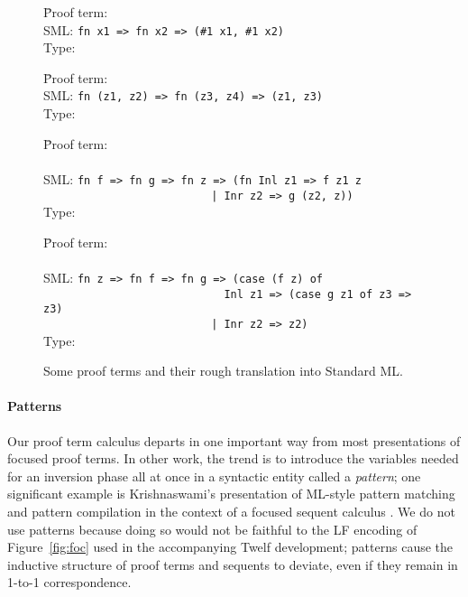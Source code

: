 \documentclass[acmtocl]{robtrans}\pdfoutput=1
\begin{document}
\begin{figure}
\begin{tabbing}
\qquad \=
Proof term: \= 
\\
\>SML: \> \verb'fn x1 => fn x2 => (#1 x1, #1 x2)'
\\
\>Type: \> 
\\
\end{tabbing}

\begin{tabbing}
\qquad \=
Proof term: \= 
\\
\>SML: \> \verb'fn (z1, z2) => fn (z3, z4) => (z1, z3)'
\\
\>Type: \> 
\\
\end{tabbing}

\begin{tabbing}
\qquad \=
Proof term: \= \=
      \\
\>\>\>
\\
\>SML: \> \verb'fn f => fn g => fn z => (fn Inl z1 => f z1 z'
\\   \>\> \verb'                          | Inr z2 => g (z2, z))'
\\
\>Type: \> 
\\
\end{tabbing}

\begin{tabbing}
\qquad \=
Proof term: \= \=\\
\>\>\>
\\
\>SML: \> \verb'fn z => fn f => fn g => (case (f z) of'
\\   \>\> \verb'                            Inl z1 => (case g z1 of z3 => z3)'
\\   \>\> \verb'                          | Inr z2 => z2)'
\\
\>Type: \> 
\end{tabbing}
\caption{Some proof terms and their rough translation into Standard ML.}
\label{fig:sml-ex}
\end{figure}

\paragraph*{Patterns}
Our proof term calculus departs in one important way from most
presentations of focused proof terms. In other work, the trend is to
introduce the variables needed for an inversion phase all at once in a
syntactic entity called a {\it pattern}; one significant example is
Krishnaswami's presentation of ML-style pattern matching and pattern
compilation in the context of a focused sequent calculus
\cite{krishnaswami09focusing}. We do not use patterns because doing so
would not be faithful to the LF encoding of Figure~\ref{fig:foc} used
in the accompanying Twelf development; patterns cause the inductive
structure of proof terms and sequents to deviate, even if they remain
in 1-to-1 correspondence. 
\end{document}
